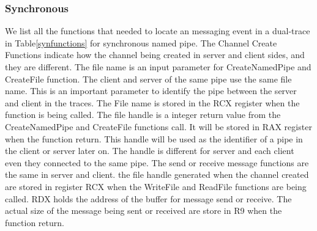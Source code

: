 \subsubsection{Synchronous}
We list all the functions that needed to locate an messaging event in a dual-trace in Table\ref{synfunctions} for synchronous named pipe. The Channel Create Functions indicate how the channel being created in server and client sides, and they are different. The file name is an input parameter for CreateNamedPipe and CreateFile function. The client and server of the same pipe use the same file name. This is an important parameter to identify the pipe between the server and client in the traces. The File name is stored in the RCX register when the function is being called. The file handle is a integer return value from the CreateNamedPipe and CreateFile functions call. It will be stored in RAX register when the function return. This handle will be used as the identifier of a pipe in the client or server later on. The handle is different for server and each client even they connected to the same pipe. The send or receive message functions are the same in server and client. the file handle generated when the channel created are stored in register RCX when the WriteFile and ReadFile functions are being called. RDX holds the address of the buffer for message send or receive. The actual size of the message being sent or received are store in R9 when the function return.
  
